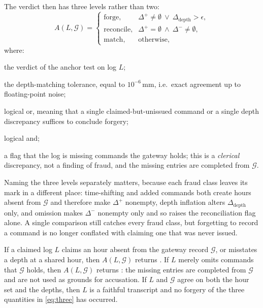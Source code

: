 The verdict then has three levels rather than two:
\begin{equation}
A(L,\mathcal{G})=
\begin{cases}
\text{forge}, & \Delta^{+}\neq\emptyset\ \vee\ \Delta_{\mathrm{depth}}>\epsilon,\\
\text{reconcile}, & \Delta^{+}=\emptyset\ \wedge\ \Delta^{-}\neq\emptyset,\\
\text{match}, & \text{otherwise},
\end{cases}
\label{eq:anchor}
\end{equation}
where:
\begin{symbolist}
\item[$A(L,\mathcal{G})$] the verdict of the anchor test on log $L$;
\item[$\epsilon$] the depth-matching tolerance, equal to $10^{-6}$\,mm, i.e.\ exact agreement up to floating-point noise;
\item[$\vee$] logical or, meaning that a single claimed-but-unissued command or a single depth discrepancy suffices to conclude forgery;
\item[$\wedge$] logical and;
\item[\text{reconcile}] a flag that the log is missing commands the gateway holds; this is a \emph{clerical} discrepancy, not a finding of fraud, and the missing entries are completed from $\mathcal{G}$.
\end{symbolist}
Naming the three levels separately matters, because each fraud class leaves its mark
in a different place: time-shifting and added commands both create hours absent from
$\mathcal{G}$ and therefore make $\Delta^{+}$ nonempty, depth inflation alters
$\Delta_{\mathrm{depth}}$ only, and omission makes $\Delta^{-}$ nonempty only and so
raises the reconciliation flag alone. A single comparison still catches every fraud
class, but forgetting to record a command is no longer conflated with claiming one
that was never issued.

\begin{proposition}
\label{prop:complete}
If a claimed log $L$ claims an hour absent from the gateway record
$\mathcal{G}$, or misstates a depth at a shared hour, then $A(L,\mathcal{G})$
returns . If $L$ merely omits commands that $\mathcal{G}$ holds, then
$A(L,\mathcal{G})$ returns : the missing entries are completed
from $\mathcal{G}$ and are not used as grounds for accusation. If $L$ and
$\mathcal{G}$ agree on both the hour set and the depths, then $L$ is a faithful
transcript and no forgery of the three quantities in \eqref{eq:three} has
occurred.
\end{proposition}

